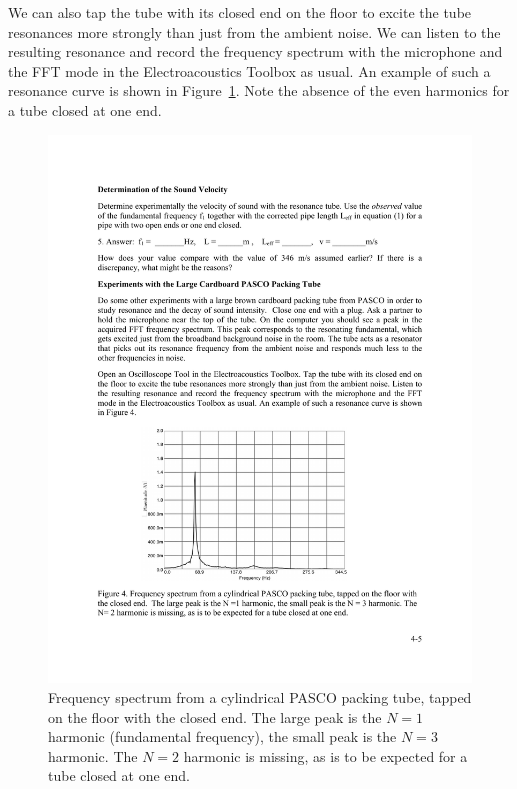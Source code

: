 \documentclass[11pt]{NSF}
\begin{document}
We can also tap the tube with its closed end on the floor to excite the 
tube resonances more strongly than just from the ambient noise. 
We can listen to the resulting resonance and record the
frequency spectrum with the microphone and the FFT mode in the Electroacoustics
Toolbox as usual. 
An example of such a resonance curve is shown in Figure~\ref{f:4}.
Note the absence of the even harmonics for a tube closed at one end.
%
\begin{figure}[hbtp]
\begin{center}
\includegraphics[width=.7\textwidth]{fig4_4}
\caption{Frequency spectrum from a cylindrical PASCO packing tube, 
tapped on the floor with the closed end. 
The large peak is the $N =1$ harmonic (fundamental frequency), 
the small peak is the $N =3$ harmonic. 
The $N =2$ harmonic is missing, as is to be expected for a tube closed at one end.}
\label{f:4} 
\end{center} 
\end{figure}
%
\end{document}
